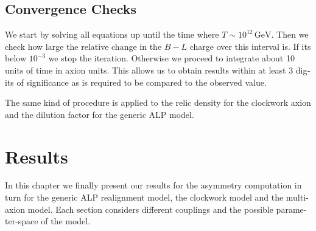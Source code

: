 \documentclass[master,       %
               twoside,        %
               BCOR10mm,       %
               english,ngerman, %
               ]{GAUBM}
\begin{document}
\begin{otherlanguage}{english}
\section{Convergence Checks}
We start by solving all equations up until the time where $T \sim 10^{12} \, \mathrm{GeV}$.
Then we check how large the relative change in the $B - L$ charge over this interval is. If its below $10^{-3}$  we stop the iteration. Otherwise we proceed to integrate about 10 units of time in axion units. This allows us to obtain results within at least 3 digits of significance as is required to be compared to the observed value.

The same kind of procedure is applied to the relic density for the clockwork axion and the dilution factor for the generic ALP model.

\chapter{Results}
\label{sec:results}
In this chapter we finally present our results for the asymmetry computation in turn for the generic ALP realignment model, the clockwork model and the multi-axion model.
Each section considers different couplings and the possible parameter-space of the model.


\end{otherlanguage}
\end{document}
